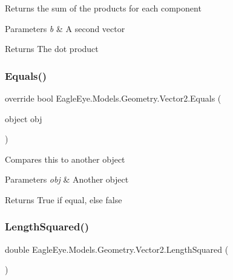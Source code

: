 Returns the sum of the products for each component 


\begin{DoxyParams}{Parameters}
{\em b} & A second vector \\
\hline
\end{DoxyParams}
\begin{DoxyReturn}{Returns}
The dot product 
\end{DoxyReturn}
\mbox{\label{struct_eagle_eye_1_1_models_1_1_geometry_1_1_vector2_a5c16724484326fee5f9551a2b3c95f75}} 
\subsubsection{\texorpdfstring{Equals()}{Equals()}}
{\footnotesize\ttfamily override bool Eagle\+Eye.\+Models.\+Geometry.\+Vector2.\+Equals (\begin{DoxyParamCaption}\item[{object}]{obj }\end{DoxyParamCaption})}



Compares this to another object 


\begin{DoxyParams}{Parameters}
{\em obj} & Another object\\
\hline
\end{DoxyParams}
\begin{DoxyReturn}{Returns}
True if equal, else false
\end{DoxyReturn}
\mbox{\label{struct_eagle_eye_1_1_models_1_1_geometry_1_1_vector2_a0164d7dc637cbdf4ace7b30aebaa3542}} 
\subsubsection{\texorpdfstring{LengthSquared()}{LengthSquared()}}
{\footnotesize\ttfamily double Eagle\+Eye.\+Models.\+Geometry.\+Vector2.\+Length\+Squared (\begin{DoxyParamCaption}{ }\end{DoxyParamCaption})}



